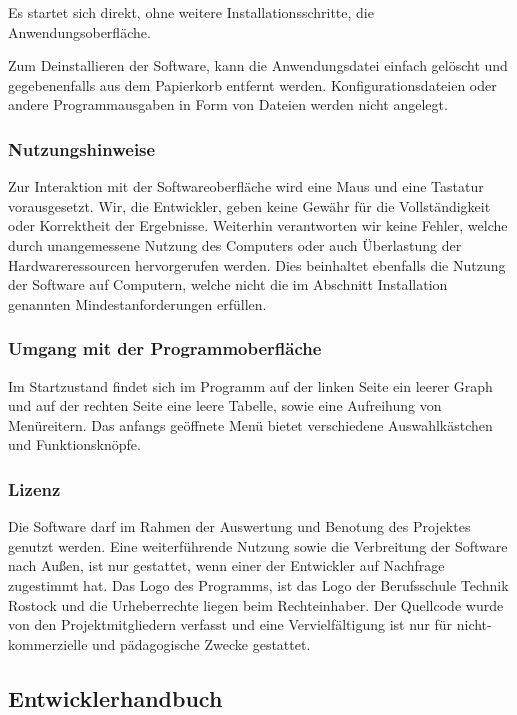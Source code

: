 \documentclass[a4paper]{article}
\begin{document}
    Es startet sich direkt, ohne weitere Installationsschritte, die Anwendungsoberfläche.

    Zum Deinstallieren der Software, kann die Anwendungsdatei einfach gelöscht und gegebenenfalls aus dem Papierkorb entfernt werden.
    Konfigurationsdateien oder andere Programmausgaben in Form von Dateien werden nicht angelegt.

    \subsubsection{Nutzungshinweise}
    
    Zur Interaktion mit der Softwareoberfläche wird eine Maus und eine Tastatur vorausgesetzt.
    Wir, die Entwickler, geben keine Gewähr für die Vollständigkeit oder Korrektheit der Ergebnisse.
    Weiterhin verantworten wir keine Fehler, welche durch unangemessene Nutzung des Computers oder auch Überlastung der Hardwareressourcen hervorgerufen werden.
    Dies beinhaltet ebenfalls die Nutzung der Software auf Computern, welche nicht die im Abschnitt Installation genannten Mindestanforderungen erfüllen.

    \subsubsection{Umgang mit der Programmoberfläche}
    
    Im Startzustand findet sich im Programm auf der linken Seite ein leerer Graph und auf der rechten Seite eine leere Tabelle, sowie eine Aufreihung von Menüreitern.
    Das anfangs geöffnete Menü bietet verschiedene Auswahlkästchen und Funktionsknöpfe.
    
    \subsubsection{Lizenz}
    
    Die Software darf im Rahmen der Auswertung und Benotung des Projektes genutzt werden.
    Eine weiterführende Nutzung sowie die Verbreitung der Software nach Außen, ist nur gestattet, wenn einer der Entwickler auf Nachfrage zugestimmt hat.
    Das Logo des Programms, ist das Logo der Berufsschule Technik Rostock und die Urheberrechte liegen beim Rechteinhaber.
    Der Quellcode wurde von den Projektmitgliedern verfasst und eine Vervielfältigung ist nur für nicht-kommerzielle und  pädagogische Zwecke gestattet.
    

\subsection{Entwicklerhandbuch}
\end{document}
